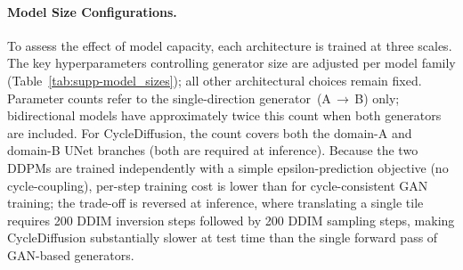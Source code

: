\paragraph{Model Size Configurations.}
\label{sec:supp-model_sizes}

To assess the effect of model capacity, each architecture is trained at three scales.
The key hyperparameters controlling generator size are adjusted per model family
(Table~\ref{tab:supp-model_sizes}); all other architectural choices remain fixed.
Parameter counts refer to the single-direction generator~(A\,$\to$\,B) only; bidirectional
models have approximately twice this count when both generators are included.
For CycleDiffusion, the count covers both the domain-A and domain-B UNet branches
(both are required at inference). Because the two DDPMs are trained independently with
a simple epsilon-prediction objective (no cycle-coupling), per-step training cost is
lower than for cycle-consistent GAN training; the trade-off is reversed at inference,
where translating a single tile requires 200 DDIM inversion steps followed by 200
DDIM sampling steps, making CycleDiffusion substantially slower at test time than the
single forward pass of GAN-based generators.

